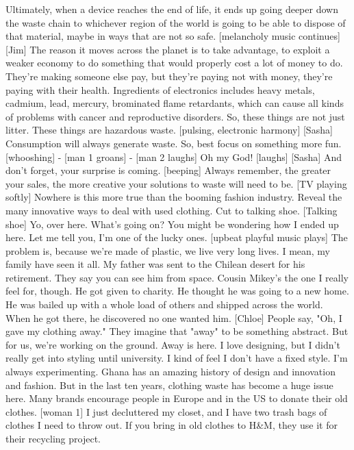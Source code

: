 \documentclass[a4paper]{article}
\begin{document}
	Ultimately, when a device reaches the end of life,
	it ends up going deeper down the waste chain to whichever
	region of the world is going to be able to
	dispose of that material, maybe in ways that are not so safe.
	[melancholy music continues]
	[Jim] The reason it moves across the planet
	is to take advantage, to exploit a weaker economy
	to do something that would properly cost a lot of money to do.
	They're making someone else pay,
	but they're paying not with money, they're paying with their health.
	Ingredients of electronics includes heavy metals,
	cadmium, lead, mercury,
	brominated flame retardants, which can cause all kinds of problems
	with cancer and reproductive disorders.
	So, these things are not just litter. These things are hazardous waste.
	[pulsing, electronic harmony]
	[Sasha] Consumption will always generate waste.
	So, best focus on something more fun.
	[whooshing]
	- [man 1 groans] - [man 2 laughs]
	Oh my God! [laughs]
	[Sasha] And don't forget, your surprise is coming.
	[beeping]
	Always remember, the greater your sales,
	the more creative your solutions to waste will need to be.
	[TV playing softly]
	Nowhere is this more true than the booming fashion industry.
	Reveal the many innovative ways to deal with used clothing.
	Cut to talking shoe.
	[Talking shoe] Yo, over here.
	What's going on?
	You might be wondering how I ended up here.
	Let me tell you, I'm one of the lucky ones.
	[upbeat playful music plays]
	The problem is, because we're made of plastic,
	we live very long lives.
	I mean, my family have seen it all.
	My father was sent to the Chilean desert for his retirement.
	They say you can see him from space.
	Cousin Mikey's the one I really feel for, though.
	He got given to charity.
	He thought he was going to a new home.
	He was bailed up with a whole load of others and shipped across the world.
	When he got there,
	he discovered no one wanted him.
	[Chloe] People say, "Oh, I gave my clothing away."
	They imagine that "away" to be something abstract.
	But for us, we're working on the ground.
	Away is here.
	I love designing, but I didn't really get into styling until university.
	I kind of feel I don't have a fixed style. I'm always experimenting.
	Ghana has an amazing history of design and innovation and fashion.
	But in the last ten years, clothing waste has become a huge issue here.
	Many brands encourage people in Europe and in the US to donate their old clothes.
	[woman 1] I just decluttered my closet,
	and I have two trash bags of clothes I need to throw out.
	If you bring in old clothes to H\&M, they use it for their recycling project.
\end{document}
